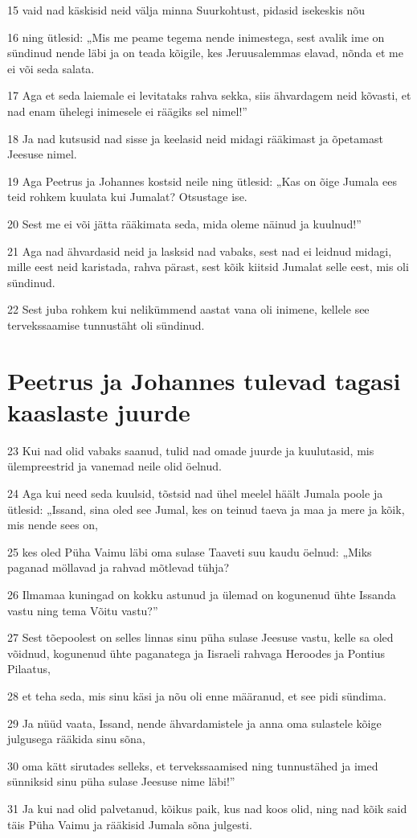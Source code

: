 \par 15 vaid nad käskisid neid välja minna Suurkohtust, pidasid isekeskis nõu
\par 16 ning ütlesid: „Mis me peame tegema nende inimestega, sest avalik ime on sündinud nende läbi ja on teada kõigile, kes Jeruusalemmas elavad, nõnda et me ei või seda salata.
\par 17 Aga et seda laiemale ei levitataks rahva sekka, siis ähvardagem neid kõvasti, et nad enam ühelegi inimesele ei räägiks sel nimel!”
\par 18 Ja nad kutsusid nad sisse ja keelasid neid midagi rääkimast ja õpetamast Jeesuse nimel.
\par 19 Aga Peetrus ja Johannes kostsid neile ning ütlesid: „Kas on õige Jumala ees teid rohkem kuulata kui Jumalat? Otsustage ise.
\par 20 Sest me ei või jätta rääkimata seda, mida oleme näinud ja kuulnud!”
\par 21 Aga nad ähvardasid neid ja lasksid nad vabaks, sest nad ei leidnud midagi, mille eest neid karistada, rahva pärast, sest kõik kiitsid Jumalat selle eest, mis oli sündinud.
\par 22 Sest juba rohkem kui nelikümmend aastat vana oli inimene, kellele see tervekssaamise tunnustäht oli sündinud.

\section*{Peetrus ja Johannes tulevad tagasi kaaslaste juurde}

\par 23 Kui nad olid vabaks saanud, tulid nad omade juurde ja kuulutasid, mis ülempreestrid ja vanemad neile olid öelnud.
\par 24 Aga kui need seda kuulsid, tõstsid nad ühel meelel häält Jumala poole ja ütlesid: „Issand, sina oled see Jumal, kes on teinud taeva ja maa ja mere ja kõik, mis nende sees on,
\par 25 kes oled Püha Vaimu läbi oma sulase Taaveti suu kaudu öelnud: „Miks paganad möllavad ja rahvad mõtlevad tühja?
\par 26 Ilmamaa kuningad on kokku astunud ja ülemad on kogunenud ühte Issanda vastu ning tema Võitu vastu?”
\par 27 Sest tõepoolest on selles linnas sinu püha sulase Jeesuse vastu, kelle sa oled võidnud, kogunenud ühte paganatega ja Iisraeli rahvaga Heroodes ja Pontius Pilaatus,
\par 28 et teha seda, mis sinu käsi ja nõu oli enne määranud, et see pidi sündima.
\par 29 Ja nüüd vaata, Issand, nende ähvardamistele ja anna oma sulastele kõige julgusega rääkida sinu sõna,
\par 30 oma kätt sirutades selleks, et tervekssaamised ning tunnustähed ja imed sünniksid sinu püha sulase Jeesuse nime läbi!”
\par 31 Ja kui nad olid palvetanud, kõikus paik, kus nad koos olid, ning nad kõik said täis Püha Vaimu ja rääkisid Jumala sõna julgesti.

